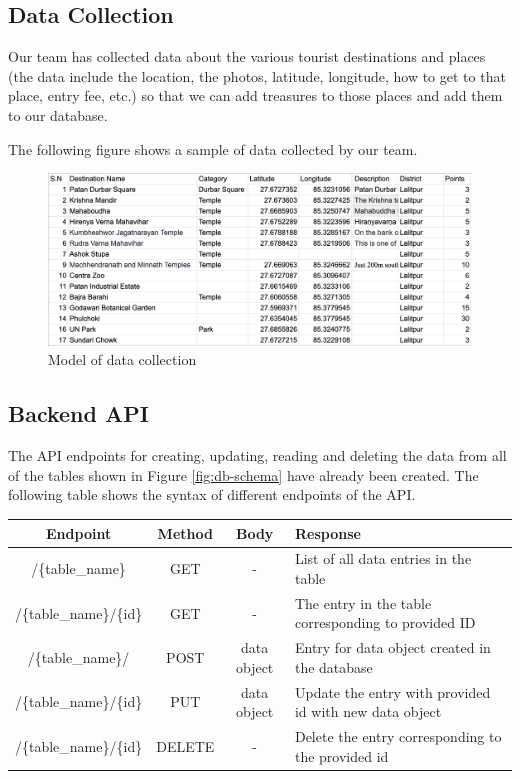 \documentclass[12pt, a4paper, oneside]{article}
\begin{document}
\subsection{Data Collection}
Our team has collected data about the various tourist destinations and places (the data include the location, the photos, latitude, longitude, how to get to that place, entry fee, etc.) so that we can add treasures to those places and add them to our database.

The following figure shows a sample of data collected by our team.


\begin{figure}[H]
\includegraphics[width=\linewidth, keepaspectratio]{screenshots/data-collection.png}
\centering
\caption{Model of data collection}
\label{fig:data-model}
\end{figure}


\subsection{Backend API}
The API endpoints for creating, updating, reading and deleting the data from all of the tables shown in Figure \ref{fig:db-schema} have already been created. The following table shows the syntax of different endpoints of the API.


\begin{table}[H]
\begin{tabularx}{\linewidth}{|c|c|c|X|}
\hline
\rowcolor[HTML]{C0C0C0} 
\textbf{Endpoint}                & \textbf{Method} & \textbf{Body}        & \textbf{Response}                                               \\ \hline
/\{table\_name\}        & GET    & -           & List of all data entries in the table                  \\ \hline
/\{table\_name\}/\{id\} & GET    & -           & The entry in the table corresponding to provided ID    \\ \hline
/\{table\_name\}/       & POST   & data object & Entry for data object created in the database          \\ \hline
/\{table\_name\}/\{id\} & PUT    & data object & Update the entry with provided id with new data object \\ \hline
/\{table\_name\}/\{id\} & DELETE & -           & Delete the entry corresponding to the provided id      \\ \hline
\end{tabularx}
\end{table}
\end{document}
